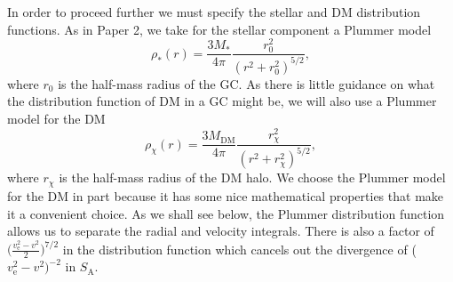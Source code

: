 \documentclass[aps,floatfix,prd,showpacs]{revtex4}
\newcommand{\vesc}{v_{\text{e}}}
\newcommand{\vp}{v^\prime}
\newcommand{\mpr}{m^\prime}
\newcommand{\SA}{S_{\text{A}}}
\newcommand{\rx}{r_\chi}
\newcommand{\MDM}{M_{\mathrm{DM}}}
\begin{document}
In order to proceed further we must specify the stellar and DM distribution functions.  As in Paper 2, we take for the stellar component a Plummer model
%
\begin{equation}
	\rho_*(r) = \frac{3M_*}{4\pi}\frac{r_0^2}{(r^2+r_0^2)^{5/2}},
\end{equation}
where $r_0$ is the half-mass radius of the GC.  As there is little guidance on what the distribution function of DM in a GC might be, we will also use a Plummer model for the DM
%
\begin{equation} 
	\rho_\chi(r) = \frac{3\MDM}{4\pi}\frac{\rx^2}{(r^2+\rx^2)^{5/2}},
\end{equation}
%
%
where $\rx$ is the half-mass radius of the DM halo.  We choose the Plummer model for the DM in part because it has some nice mathematical properties that make it a convenient choice.  As we shall see below, the Plummer distribution function allows us to separate the radial and velocity integrals.  There is also a factor of $\big(\frac{\vesc^2 - {v}^2}{2}\big)^{7/2}$ in the distribution function which cancels out the divergence of ($\vesc^2 - v^2)^{-2}$ in $\SA$.  
%
%
\end{document}
